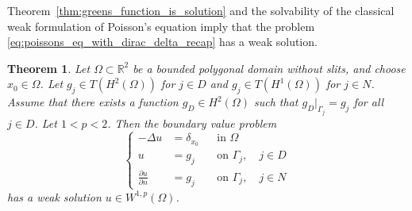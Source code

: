 \documentclass[english, 12pt, a4paper, sci, utf8, a-2b, online]{aaltothesis}
\theoremstyle{definition}
\theoremstyle{plain}
\newtheorem{theorem}{Theorem}[section]
\numberwithin{equation}{section}
\begin{document}
Theorem~\ref{thm:greens_function_is_solution} and the solvability of
the classical weak formulation of Poisson's equation imply that the problem
\eqref{eq:poissons_eq_with_dirac_delta_recap} has a weak solution.
\begin{theorem}
    \label{thm:dirac_load_is_solvable}
    Let $\Omega \subset \mathbb{R}^2$ be a bounded polygonal domain without slits,
    and choose $x_0 \in \Omega$.
    Let $g_j \in T(H^2(\Omega))$ for $j \in D$ and $g_j \in T(H^1(\Omega))$
    for $j \in N$. Assume that there exists a function $g_D \in H^2(\Omega)$
    such that $g_D|_{\Gamma_j} = g_j$ for all $j \in D$.
    Let $1 < p < 2$. Then the boundary value problem
    \begin{equation}
        \label{eq:dirac_load_is_solvable_problem}
        \left\{
            \begin{aligned}
                -\Delta u &= \delta_{x_0} && \text{in } \Omega \\
                u &= g_j && \text{on } \Gamma_j, \quad j \in D \\
                \frac{\partial u}{\partial n} &= g_j && \text{on } \Gamma_j,
                \quad j \in N
            \end{aligned}
        \right.
    \end{equation}
    has a weak solution $u \in W^{1,p}(\Omega)$.
\end{theorem}
\end{document}
